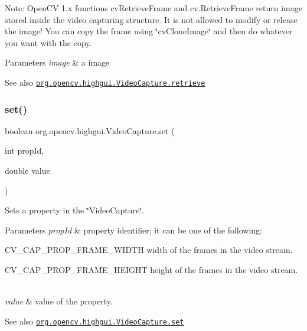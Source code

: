 Note\+: Open\+CV 1.\+x functions {\ttfamily cv\+Retrieve\+Frame} and {\ttfamily cv.\+Retrieve\+Frame} return image stored inside the video capturing structure. It is not allowed to modify or release the image! You can copy the frame using \char`\"{}cv\+Clone\+Image\char`\"{} and then do whatever you want with the copy.


\begin{DoxyParams}{Parameters}
{\em image} & a image\\
\hline
\end{DoxyParams}
\begin{DoxySeeAlso}{See also}
\href{http://docs.opencv.org/modules/highgui/doc/reading_and_writing_images_and_video.html#videocapture-retrieve}{\tt org.\+opencv.\+highgui.\+Video\+Capture.\+retrieve} 
\end{DoxySeeAlso}
\mbox{\label{classorg_1_1opencv_1_1highgui_1_1_video_capture_a49596c3c8d967eb4ab09ad54d9cf2909}} 
\subsubsection{\texorpdfstring{set()}{set()}}
{\footnotesize\ttfamily boolean org.\+opencv.\+highgui.\+Video\+Capture.\+set (\begin{DoxyParamCaption}\item[{int}]{prop\+Id,  }\item[{double}]{value }\end{DoxyParamCaption})}

Sets a property in the \char`\"{}\+Video\+Capture\char`\"{}.


\begin{DoxyParams}{Parameters}
{\em prop\+Id} & property identifier; it can be one of the following\+:
\begin{DoxyItemize}
\item C\+V\+\_\+\+C\+A\+P\+\_\+\+P\+R\+O\+P\+\_\+\+F\+R\+A\+M\+E\+\_\+\+W\+I\+D\+TH width of the frames in the video stream.
\item C\+V\+\_\+\+C\+A\+P\+\_\+\+P\+R\+O\+P\+\_\+\+F\+R\+A\+M\+E\+\_\+\+H\+E\+I\+G\+HT height of the frames in the video stream. 
\end{DoxyItemize}\\
\hline
{\em value} & value of the property.\\
\hline
\end{DoxyParams}
\begin{DoxySeeAlso}{See also}
\href{http://docs.opencv.org/modules/highgui/doc/reading_and_writing_images_and_video.html#videocapture-set}{\tt org.\+opencv.\+highgui.\+Video\+Capture.\+set} 
\end{DoxySeeAlso}



